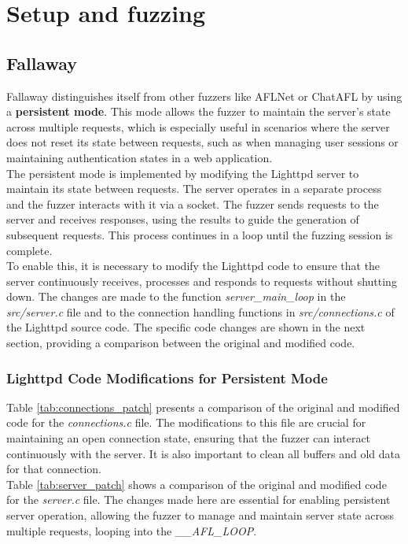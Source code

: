 \chapter{Setup and fuzzing}
\label{chap:Setup}

\section{Fallaway}
Fallaway distinguishes itself from other fuzzers like AFLNet or ChatAFL by using a \textbf{persistent mode}. This mode allows the fuzzer to maintain the server's state across multiple requests, which is especially useful in scenarios where the server does not reset its state between requests, such as when managing user sessions or maintaining authentication states in a web application.
\\The persistent mode is implemented by modifying the Lighttpd server to maintain its state between requests. The server operates in a separate process and the fuzzer interacts with it via a socket. The fuzzer sends requests to the server and receives responses, using the results to guide the generation of subsequent requests. This process continues in a loop until the fuzzing session is complete.
\\To enable this, it is necessary to modify the Lighttpd code to ensure that the server continuously receives, processes and responds to requests without shutting down. The changes are made to the function \textit{server\_main\_loop} in the \textit{src/server.c} file and to the connection handling functions in \textit{src/connections.c} of the Lighttpd source code. The specific code changes are shown in the next section, providing a comparison between the original and modified code.

\subsection{Lighttpd Code Modifications for Persistent Mode}

Table \ref{tab:connections_patch} presents a comparison of the original and modified code for the \textit{connections.c} file. The modifications to this file are crucial for maintaining an open connection state, ensuring that the fuzzer can interact continuously with the server. It is also important to clean all buffers and old data for that connection.
\\Table \ref{tab:server_patch} shows a comparison of the original and modified code for the \textit{server.c} file. The changes made here are essential for enabling persistent server operation, allowing the fuzzer to manage and maintain server state across multiple requests, looping into the \textit{\_\_AFL\_LOOP}.

